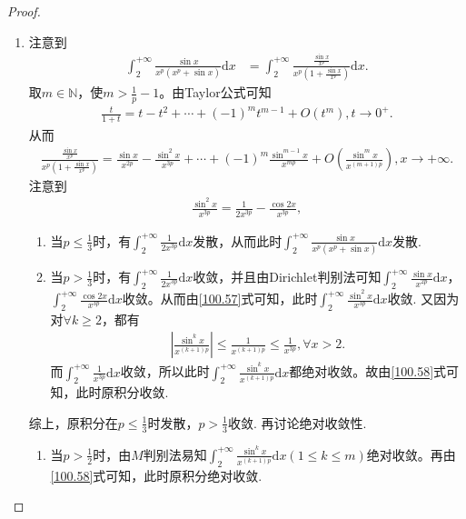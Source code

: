 \documentclass[../../main.tex]{subfiles}%
\begin{document}
\begin{proof}
\begin{enumerate}
\item 注意到
\begin{align*}
\int_{2}^{+\infty}\frac{\sin x}{x^p(x^p + \sin x)}\mathrm{d}x&=\int_{2}^{+\infty}\frac{\frac{\sin x}{x^p}}{x^p(1 + \frac{\sin x}{x^p})}\mathrm{d}x.
\end{align*}
取\(m\in \mathbb{N}\)，使\(m > \frac{1}{p}-1\)。由Taylor公式可知
\begin{align*}
\frac{t}{1 + t}=t - t^2+\cdots + (-1)^mt^{m - 1}+O(t^m),t\rightarrow 0^+.
\end{align*}
从而
\begin{align}
\frac{\frac{\sin x}{x^p}}{x^p(1 + \frac{\sin x}{x^p})}=\frac{\sin x}{x^{2p}}-\frac{\sin^2 x}{x^{3p}}+\cdots + (-1)^m\frac{\sin^{m - 1} x}{x^{mp}}+O\left(\frac{\sin^m x}{x^{(m + 1)p}}\right),x\rightarrow +\infty. \label{100.58}
\end{align}
注意到
\begin{align}
\frac{\sin^2 x}{x^{3p}}=\frac{1}{2x^{3p}}-\frac{\cos 2x}{x^{3p}}, \label{100.57}
\end{align}
\begin{enumerate}
\item[(i)] 当\(p\leqslant \frac{1}{3}\)时，有\(\int_{2}^{+\infty}\frac{1}{2x^{3p}}\mathrm{d}x\)发散，从而此时\(\int_{2}^{+\infty}\frac{\sin x}{x^p(x^p + \sin x)}\mathrm{d}x\)发散.
\item[(ii)] 当\(p > \frac{1}{3}\)时，有\(\int_{2}^{+\infty}\frac{1}{2x^{3p}}\mathrm{d}x\)收敛，并且由Dirichlet判别法可知\(\int_{2}^{+\infty}\frac{\sin x}{x^{2p}}\mathrm{d}x\)，\(\int_{2}^{+\infty}\frac{\cos 2x}{x^{3p}}\mathrm{d}x\)收敛。从而由\eqref{100.57}式可知，此时\(\int_{2}^{+\infty}\frac{\sin^2 x}{x^{3p}}\mathrm{d}x\)收敛.
又因为对\(\forall k\geqslant 2\)，都有
\begin{align*}
\left|\frac{\sin^k x}{x^{(k + 1)p}}\right|\leqslant\frac{1}{x^{(k + 1)p}}\leqslant\frac{1}{x^{3p}},\forall x > 2.
\end{align*}
而\(\int_{2}^{+\infty}\frac{1}{x^{3p}}\mathrm{d}x\)收敛，所以此时\(\int_{2}^{+\infty}\frac{\sin^k x}{x^{(k + 1)p}}\mathrm{d}x\)都绝对收敛。故由\eqref{100.58}式可知，此时原积分收敛.
\end{enumerate}
综上，原积分在\(p\leqslant \frac{1}{3}\)时发散，\(p > \frac{1}{3}\)收敛.
再讨论绝对收敛性.
\begin{enumerate}
\item 当\(p > \frac{1}{2}\)时，由$M$判别法易知\(\int_{2}^{+\infty}\frac{\sin^k x}{x^{(k + 1)p}}\mathrm{d}x(1\leqslant  k\leqslant  m)\)绝对收敛。再由\eqref{100.58}式可知，此时原积分绝对收敛.

\end{enumerate}
\end{enumerate}
\end{proof}
\end{document}
